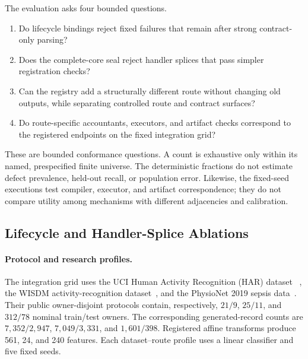 The evaluation asks four bounded questions.

\begin{enumerate}
    \item[\textbf{Q1.}] Do lifecycle bindings reject fixed failures that remain
    after strong contract-only parsing?

    \item[\textbf{Q2.}] Does the complete-core seal reject handler splices that
    pass simpler registration checks?

    \item[\textbf{Q3.}] Can the registry add a structurally different route without
    changing old outputs, while separating controlled route and contract surfaces?

    \item[\textbf{Q4.}] Do route-specific accountants, executors, and artifact
    checks correspond to the registered endpoints on the fixed integration grid?
\end{enumerate}

These are bounded conformance questions.  A count is exhaustive only within its
named, prespecified finite universe.  The deterministic fractions do not estimate
defect prevalence, held-out recall, or population error.  Likewise, the fixed-seed
executions test compiler, executor, and artifact correspondence; they do not
compare utility among mechanisms with different adjacencies and calibration.

\subsection{Lifecycle and Handler-Splice Ablations}
\label{subsec:ch3-lifecycle-ablation}

\paragraph{Protocol and research profiles.}
The integration grid uses the UCI Human Activity Recognition (HAR) dataset
~\cite{anguita2013har,reyesortiz2013uci}, the WISDM
activity-recognition dataset~\cite{kwapisz2011activity}, and the PhysioNet 2019
sepsis data~\cite{reyna2019sepsis,reyna2020sepsis,goldberger2000physiobank}.
Their public owner-disjoint protocols contain, respectively, \(21/9\), \(25/11\),
and \(312/78\) nominal train/test owners.  The corresponding generated-record
counts are \(7{,}352/2{,}947\), \(7{,}049/3{,}331\), and
\(1{,}601/398\).  Registered affine transforms produce 561, 24, and 240 features.
Each dataset--route profile uses a linear classifier and five fixed seeds.

